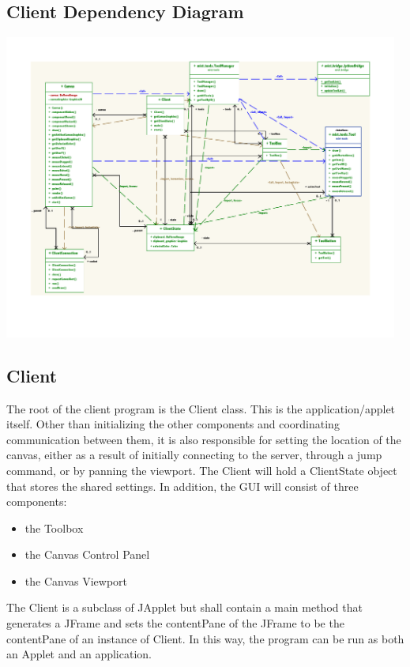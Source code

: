 \documentclass[11pt,oneside,a4paper]{article}
\begin{document}
\subsection{Client Dependency Diagram}
\begin{center}
 \includegraphics[width=130mm]{Client1.pdf}
\end{center}

 \subsection{Client}
  The root of the client program is the Client class. This is the
  application/applet itself. Other than initializing the other components and
  coordinating communication between them, it is also responsible for setting the
  location of the canvas, either as a result of initially connecting to the
  server, through a jump command, or by panning the viewport. The Client will
  hold a ClientState object that stores the shared settings. In addition, the GUI
  will consist of three components:
  \begin{itemize}
   \item the Toolbox
   \item the Canvas Control Panel
   \item the Canvas Viewport
  \end{itemize}
 The Client is a subclass of JApplet but shall contain a main method that
 generates a JFrame and sets the contentPane of the JFrame to be the
 contentPane of an instance of Client. In this way, the program can be run as
 both an Applet and an application.
 
\end{document}
